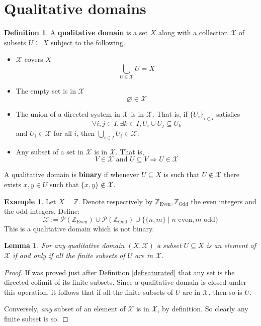 \documentclass[12pt]{article}
\theoremstyle{plain}
\newtheorem{lemma}[thm]{Lemma}
\theoremstyle{definition}
\newtheorem{defn}[thm]{Definition} %
\newtheorem{example}[thm]{Example}
\newcommand{\bb}[1]{\mathbb{#1}}
\newcommand{\scr}[1]{\mathscr{#1}}
\newcommand{\call}[1]{\mathcal{#1}}
\begin{document}
	\section{Qualitative domains}
	\begin{defn}
		A \textbf{qualitative domain} is a set $X$ along with a collection $\scr{X}$ of subsets $U \subseteq X$ subject to the following.
		\begin{itemize}
			\item $\scr{X}$ covers $X$
			\begin{equation}
				\bigcup_{U \in \scr{X}}U = X
				\end{equation}
			\item The empty set is in $\scr{X}$
			\begin{equation}
				\varnothing \in \scr{X}
				\end{equation}
			\item The union of a directed system in $\scr{X}$ is in $\scr{X}$. That is, if $\{ U_i \}_{i \in I}$ satisfies
			\begin{equation}
				\forall i, j \in I, \exists k \in I, U_i \cup U_j \subseteq U_k
				\end{equation}
			and $U_i \in \scr{X}$ for all $i$, then $\bigcup_{i \in I} U_i \in \scr{X}$.
			\item Any subset of a set in $\scr{X}$ is in $\scr{X}$. That is,
			\begin{equation}
				V \in \scr{X}\text{ and }U \subseteq V \Longrightarrow U \in \scr{X}
				\end{equation}
			\end{itemize}
		A qualitative domain is \textbf{binary} if whenever $U\subseteq X$ is such that $U \not\in \scr{X}$ there exists $x,y \in U$ such that $\{ x,y \} \not\in \scr{X}$.
		\end{defn}
	
	\begin{example}
		Let $X = \bb{Z}$. Denote respectively by $\bb{Z}_{\text{Even}}, \bb{Z}_{\text{Odd}}$ the even integers and the odd integers. Define:
		\begin{equation}
			\scr{X} := \call{P}(\bb{Z}_{\text{Even}}) \cup \call{P}(\bb{Z}_{\text{Odd}}) \cup \Big\{ \{ n, m \} \mid n\text{ even}, m\text{ odd}\Big\}
			\end{equation}
		This is a qualitative domain which is not binary.
		\end{example}
	\begin{lemma}\label{lem:finite_subsets}
		For any qualitative domain $(X,\scr{X})$ a subset $U \subseteq X$ is an element of $\scr{X}$ if and only if all the finite subsets of $U$ are in $\scr{X}$.
		\end{lemma}
	\begin{proof}
		If was proved just after Definition \ref{def:saturated} that any set is the directed colimit of its finite subsets. Since a qualitative domain is closed under this operation, it follows that if all the finite subsets of $U$ are in $\scr{X}$, then so is $U$.
		
		Conversely, \emph{any} subset of an element of $\scr{X}$ is in $\scr{X}$, by definition. So clearly any finite subset is so.
		\end{proof}
	
\end{document}
